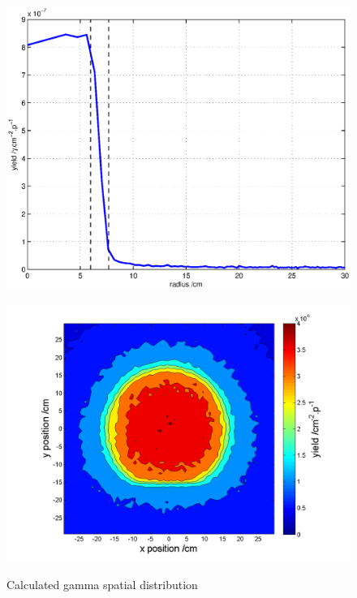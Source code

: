 \documentclass[peerreviewca,11pt,a4paper]{IEEEtran}
\let\MYoriglatexcaption\caption
\renewcommand{\caption}[2][\relax]{\MYoriglatexcaption[#2]{#2}}
\begin{document}
\begin{figure}[t]
    \begin{minipage}{\columnwidth}
        \includegraphics[width=0.9\columnwidth]{GSUPRadiusEffectaboveAllRADECS.eps}
        \label{fig:GammaSpatialDistributionSUP}
    \end{minipage}
    \begin{minipage}{\columnwidth}
        \includegraphics[width=0.9\columnwidth]{CUP10ColSpatialDistributionAllG.png}
        \label{fig:GammaSpatialDistributionCUP}
    \end{minipage}
    \caption{
        Calculated gamma spatial distribution
    }
    \label{fig:GammaSpatialDistribution}
\end{figure}
\end{document}
